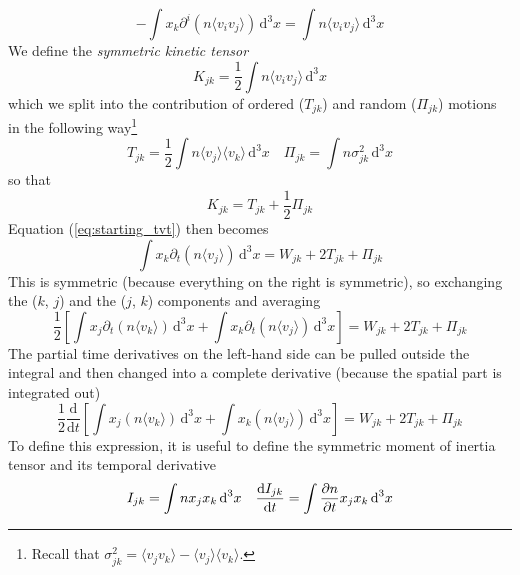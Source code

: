 \begin{equation*}
    -\int x_{k}\partial^{i}(n\langle v_{i}v_{j}\rangle)\,\text{d}^{3}x = \int n\langle v_{i}v_{j}\rangle\,\text{d}^{3}x
\end{equation*}
We define the \emph{symmetric kinetic tensor}
\begin{equation}
    K_{jk} = \frac{1}{2}\int n \langle v_{i}v_{j}\rangle\,\text{d}^{3}x
    \label{eq:skt}
\end{equation}
which we split into the contribution of ordered ($T_{jk}$) and random ($\Pi_{jk}$) motions in the following way\footnote{Recall that $\sigma_{jk}^{2} = \langle v_{j}v_{k}\rangle - \langle v_{j}\rangle \langle v_{k}\rangle$.}
\begin{equation}
    T_{jk} = \frac{1}{2}\int n \langle v_{j}\rangle\langle v_{k}\rangle\,\text{d}^{3}x \quad \Pi_{jk} = \int n \sigma^{2}_{jk}\,\text{d}^{3}x
    \label{eq:kinetictensor_decomp}
\end{equation}
so that 
\begin{equation*}
    K_{jk} = T_{jk}+\frac{1}{2}\Pi_{jk}
\end{equation*}
Equation (\ref{eq:starting_tvt}) then becomes 
\begin{equation*}
    \int x_{k}\partial_{t}(n\langle v_{j}\rangle)\,\text{d}^{3}x = W_{jk}+2T_{jk}+\Pi_{jk}
\end{equation*}
This is symmetric (because everything on the right is symmetric), so exchanging the ($k$, $j$) and the ($j$, $k$) components and averaging
\begin{equation*}
    \frac{1}{2}\left[\int x_{j}\partial_{t}(n\langle v_{k}\rangle)\,\text{d}^{3}x + \int x_{k}\partial_{t}(n\langle v_{j}\rangle)\,\text{d}^{3}x \right] = W_{jk}+2T_{jk}+\Pi_{jk}
\end{equation*}
The partial time derivatives on the left-hand side can be pulled outside the integral and then changed into a complete derivative (because the spatial part is integrated out)
\begin{equation*}
    \frac{1}{2}\frac{\text{d}}{\text{d}t}\left[\int x_{j}(n\langle v_{k}\rangle)\,\text{d}^{3}x + \int x_{k}(n\langle v_{j}\rangle)\,\text{d}^{3}x \right] = W_{jk}+2T_{jk}+\Pi_{jk}
\end{equation*}
To define this expression, it is useful to define the symmetric moment of inertia tensor and its temporal derivative 
\begin{equation}
    I_{jk} = \int n x_{j}x_{k}\,\text{d}^{3}x \quad \frac{\text{d}I_{jk}}{\text{d}t} = \int \frac{\partial n}{\partial t}x_{j}x_{k}\,\text{d}^{3}x
    \label{eq:inertiatensor}
\end{equation}
